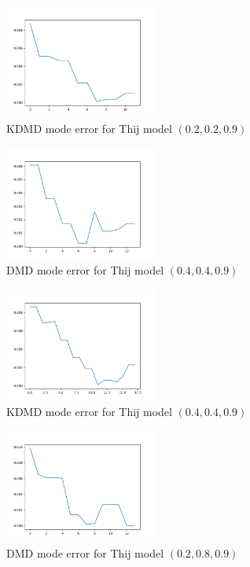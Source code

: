 \begin{figure}
    \includegraphics[width=5cm]{Images/mode_error_kdmd_twitter_020209.png}
    \centering
    \caption{KDMD mode error for Thij model $(0.2,0.2,0.9)$}
\end{figure}


\begin{figure}
    \includegraphics[width=5cm]{Images/mode_error_dmd_twitter_040409.png}
    \centering
    \caption{DMD mode error for Thij model $(0.4,0.4,0.9)$}
\end{figure}


\begin{figure}
    \includegraphics[width=5cm]{Images/mode_error_kdmd_twitter_040409.png}
    \centering
    \caption{KDMD mode error for Thij model $(0.4,0.4,0.9)$}
\end{figure}


\begin{figure}
    \includegraphics[width=5cm]{Images/mode_error_dmd_twitter_020809.png}
    \centering
    \caption{DMD mode error for Thij model $(0.2,0.8,0.9)$}
\end{figure}


